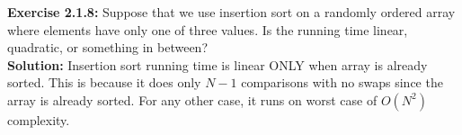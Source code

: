 \documentclass[11pt,fleqn]{article}
\begin{document}
\textbf{Exercise 2.1.8:} Suppose that we use insertion sort on a randomly ordered array where elements
have only one of three values. Is the running time linear, quadratic, or something in
between?\\

\textbf{Solution:}
Insertion sort running time is linear ONLY when array is already sorted. This is because it does only $N-1$ comparisons with no swaps since the array is already sorted. For any other case, it runs on worst case of $O(N^2)$ complexity.
\end{document}
